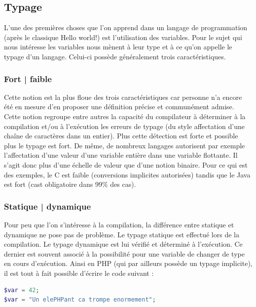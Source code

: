 \subsection{Typage}
\label{typage}

L'une des premières choses que l'on apprend dans un langage de programmation (après le classique Hello world!) est l'utilisation des variables. Pour le sujet qui nous intéresse les variables nous mènent à leur type et à ce qu'on appelle le typage d'un langage. Celui-ci possède généralement trois caractéristiques. \cite{bib_wiki_typage}

\subsubsection{Fort | faible}
\label{fort_faible}

Cette notion est la plus floue des trois caractéristiques car personne n'a encore été en mesure d'en proposer une définition précise et communément admise. Cette notion regroupe entre autres la capacité du compilateur à déterminer à la compilation et/ou à l'exécution les erreurs de typage (du style affectation d'une chaîne de caractères dans un entier). Plus cette détection est forte et possible plus le typage est fort. De même, de nombreux langages autorisent par exemple l'affectation d'une valeur d'une variable entière dans une variable flottante. Il s'agit donc plus d'une échelle de valeur que d'une notion binaire. Pour ce qui est des exemples, le C est faible (conversions implicites autorisées) tandis que le Java est fort (cast obligatoire dans 99\% des cas).

\subsubsection{Statique | dynamique}
\label{statique_dynamique}

Pour peu que l'on s'intéresse à la compilation, la différence entre statique et dynamique ne pose pas de problème. Le typage statique est effectué lors de la compilation. Le typage dynamique est lui vérifié et déterminé à l'exécution. Ce dernier est souvent associé à la possibilité pour une variable de changer de type en cours d'exécution. Ainsi en PHP (qui par ailleurs possède un typage implicite), il est tout à fait possible d'écrire le code suivant :

\begin{lstlisting}[language=php]
$var = 42;
$var = "Un elePHPant ca trompe enormement";
\end{lstlisting}

